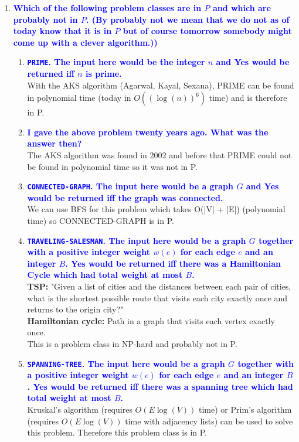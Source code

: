 \documentclass[11pt]{article}
\begin{document}
\begin{enumerate}
\item \textbf{\textcolor{blue}{Which of the following problem classes are in $P$ and which are probably not in $P$.  (By probably not we mean that we do not as of today know that it is in $P$ but of course tomorrow somebody might come up with a clever algorithm.))}}
\begin{enumerate}
    \item \textbf{\textcolor{blue}{{\tt PRIME}. The input here would be the integer $n$ and Yes would be returned iff $n$ is prime.}}
        \\ With the AKS algorithm (Agarwal, Kayal, Sexana), PRIME can be found in polynomial time (today in $O((\log(n))^6)$ time) and is therefore in P.
    \item \textbf{\textcolor{blue}{I gave the above problem twenty years ago.  What was the answer then?}}
        \\ The AKS algorithm was found in 2002 and before that PRIME could not be found in polynomial time so it was not in P.
    \item \textbf{\textcolor{blue}{{\tt CONNECTED-GRAPH}.  The input here would be a graph $G$ and Yes would be returned iff the graph was connected.}}
        \\ We can use BFS for this problem which takes O(|V| + |E|) (polynomial time) so CONNECTED-GRAPH is in P.
    \item \textbf{\textcolor{blue}{{\tt TRAVELING-SALESMAN}. The input here would be a graph $G$ together with a positive integer weight $w(e)$ for each edge $e$ and an integer $B$.  Yes would be returned iff there was a Hamiltonian Cycle which had total weight at most $B$.}}
        \\ \textbf{TSP: } "Given a list of cities and the distances between each pair of cities, what is the shortest possible route that visits each city exactly once and returns to the origin city?"
        \\ \textbf{Hamiltonian cycle: } Path in a graph that visits each vertex exactly once.
        \\ This is a problem class in NP-hard and probably not in P.
    \item \textbf{\textcolor{blue}{{\tt SPANNING-TREE}. The input here would be a graph $G$ together with a positive integer weight $w(e)$ for each edge $e$ and an integer $B$.  Yes would be returned iff there was a spanning tree which had total weight at most $B$.}}
        \\ Kruskal's algorithm (requires $O(E\log(V))$ time) or Prim's algorithm (requires $O(E\log(V))$ time with adjacency lists) can be used to solve this problem. Therefore this problem class is in P.

\end{enumerate}
\end{enumerate}
\end{document}

